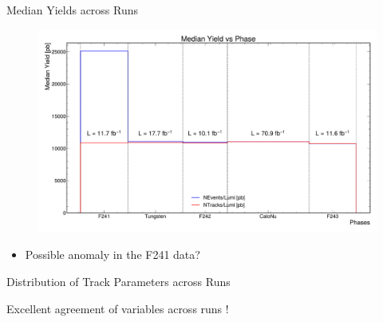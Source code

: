 \begin{frame}{Median Yields across Runs}
	\begin{figure}
		\includegraphics[width=\linewidth]{./RunwisePlots/MedianYieldsPhase.pdf}
	\end{figure}
	\vspace{-0.5cm}
	\begin{itemize}
		\item Possible anomaly in the F241 data?
	\end{itemize}
\end{frame}

\begin{frame}{Distribution of Track Parameters across Runs}
	\begin{center}
		Excellent agreement of variables across runs !
	\end{center}
	
\end{frame}


